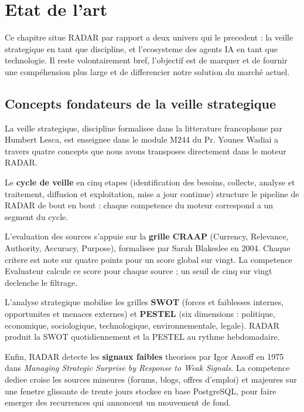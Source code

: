 \documentclass[12pt,a4paper,openany]{report}
\begin{document}
\chapter{Etat de l'art}
\label{chap:etat-art}

Ce chapitre situe RADAR par rapport a deux univers qui le precedent : la veille strategique en tant que discipline, et l'ecosysteme des agents IA en tant que technologie. Il reste volontairement bref, l'objectif est de marquer et de fournir une compéhension plus large et de differencier notre solution du marché actuel.

\section{Concepts fondateurs de la veille strategique}
\label{sec:concepts-veille}

La veille strategique, discipline formalisee dans la litterature francophone par Humbert Lesca, est enseignee dans le module M244 du Pr. Younes Wadiai a travers quatre concepts que nous avons transposes directement dans le moteur RADAR.

Le \textbf{cycle de veille} en cinq etapes (identification des besoins, collecte, analyse et traitement, diffusion et exploitation, mise a jour continue) structure le pipeline de RADAR de bout en bout : chaque competence du moteur correspond a un segment du cycle.

L'evaluation des sources s'appuie sur la \textbf{grille CRAAP} (Currency, Relevance, Authority, Accuracy, Purpose), formalisee par Sarah Blakeslee en 2004. Chaque critere est note sur quatre points pour un score global sur vingt. La competence Evaluateur calcule ce score pour chaque source ; un seuil de cinq sur vingt declenche le filtrage.

L'analyse strategique mobilise les grilles \textbf{SWOT} (forces et faiblesses internes, opportunites et menaces externes) et \textbf{PESTEL} (six dimensions : politique, economique, sociologique, technologique, environnementale, legale). RADAR produit la SWOT quotidiennement et la PESTEL au rythme hebdomadaire.

Enfin, RADAR detecte les \textbf{signaux faibles} theorises par Igor Ansoff en 1975 dans \textit{Managing Strategic Surprise by Response to Weak Signals}. La competence dediee croise les sources mineures (forums, blogs, offres d'emploi) et majeures sur une fenetre glissante de trente jours stockee en base PostgreSQL, pour faire emerger des recurrences qui annoncent un mouvement de fond.
\end{document}
